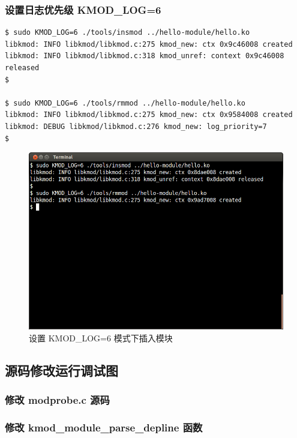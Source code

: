 \documentclass[11pt,a4paper]{article}
\makeatletter
\def\maxwidth{\ifdim\Gin@nat@width>\linewidth\linewidth
\else\Gin@nat@width\fi}
\let\Oldincludegraphics\includegraphics
\renewcommand{\includegraphics}[1]{\Oldincludegraphics[width=\maxwidth]{#1}}
\makeatother
\begin{document}
\subsubsection{设置日志优先级 KMOD\_LOG=6}

{\begin{shaded}\begin{verbatim}
$ sudo KMOD_LOG=6 ./tools/insmod ../hello-module/hello.ko
libkmod: INFO libkmod/libkmod.c:275 kmod_new: ctx 0x9c46008 created
libkmod: INFO libkmod/libkmod.c:318 kmod_unref: context 0x9c46008 released
$ 

$ sudo KMOD_LOG=6 ./tools/rmmod ../hello-module/hello.ko
libkmod: INFO libkmod/libkmod.c:275 kmod_new: ctx 0x9584008 created
libkmod: DEBUG libkmod/libkmod.c:276 kmod_new: log_priority=7
$ 
\end{verbatim}\end{shaded}}
\begin{figure}[htbp]
\centering
\includegraphics{./pictures/2-4-insmod2.png}
\caption{设置 KMOD\_LOG=6 模式下插入模块}
\end{figure}

\subsection{源码修改运行调试图}

\subsubsection{修改 modprobe.c 源码}

\subsubsection{修改 kmod\_module\_parse\_depline 函数}
\end{document}
